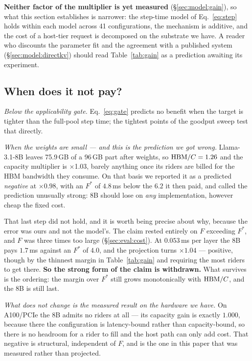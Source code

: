 \textbf{Neither factor of the multiplier is yet measured} (\S\ref{sec:model:gain}),
so what this section establishes is narrower: the step-time model of
Eq.~\ref{eq:step} holds within each model across 41 configurations, the mechanism is
additive, and the cost of a host-tier request is decomposed on the substrate we
have. A reader who discounts the parameter fit and the agreement with a published
system (\S\ref{sec:model:directkv}) should read Table~\ref{tab:gain} as a prediction
awaiting its experiment.

\subsection{When does it not pay?}
\label{sec:eval:negative}

\emph{Below the applicability gate.} Eq.~\ref{eq:gate} predicts no benefit when the
target is tighter than the full-pool step time; the tightest points of the goodput
sweep test that directly.

\emph{When the weights are small --- and this is the prediction we got wrong.}
Llama-3.1-8B leaves 75.9\,GB of a 96\,GB part after weights, so
$\mathrm{HBM}/C = 1.26$ and the capacity multiplier is $\times$1.03, barely anything once
its riders are billed for the HBM bandwidth they consume. On that basis we reported
it as a predicted \emph{negative} at $\times 0.98$, with an $F^{*}$ of $4.8$\,ms
below the $6.2$ it then paid, and called the prediction unusually strong: 8B should
lose on \emph{any} implementation, however cheap the fixed cost.

That last step did not hold, and it is worth being precise about why, because the
error was ours and not the model's. The claim rested entirely on $F$ exceeding
$F^{*}$, and $F$ was three times too large (\S\ref{sec:eval:cost}). At
$0.053$\,ms per layer the 8B pays $1.7$\,ms against an $F^{*}$ of $4.0$, and the
projection turns $\times 1.04$ --- positive, though by the thinnest margin in
Table~\ref{tab:gain} and requiring the most riders to get there. \textbf{So the
strong form of the claim is withdrawn.} What survives is the ordering: the margin
over $F^{*}$ still grows monotonically with $\mathrm{HBM}/C$, and the 8B is still last.

\emph{What does not change is the measured result on the hardware we have.} On
A100/PCIe the 8B admits no riders at all --- its capacity gain is exactly $1.000$,
because there the configuration is latency-bound rather than capacity-bound, so
there is no headroom for a rider to fill and the host path can only add cost. That
negative is structural, independent of $F$, and is the one in this paper that was
measured rather than projected.

